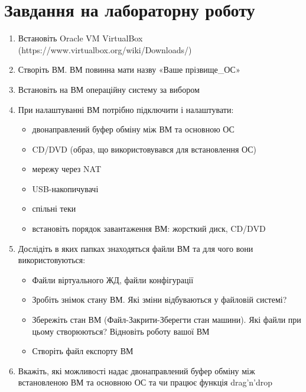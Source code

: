 \documentclass[12pt,a4paper]{article}
\begin{document}
\section{Завдання на лабораторну роботу}
\begin{enumerate}
	\item Встановіть Oracle VM VirtualBox (https://www.virtualbox.org/wiki/Downloads/)
	\item Створіть ВМ. ВМ повинна мати назву «Ваше прізвище\_ОС»
	\item Встановіть на ВМ операційну систему за вибором
	\item При налаштуванні ВМ потрібно підключити і налаштувати:
		\begin{itemize}
			\item двонаправлений буфер обміну між ВМ та основною ОС
			\item CD/DVD (образ, що використовувався для встановлення ОС)
			\item мережу через NAT
			\item USB-накопичувачі
			\item спільні теки
			\item встановіть порядок завантаження ВМ: жорсткий диск, CD/DVD
		\end{itemize}
	\item Дослідіть в яких папках знаходяться файли ВМ та для чого вони використовуються:
		\begin{itemize}
			\item Файли віртуального ЖД, файли конфігурації
			\item Зробіть знімок стану ВМ. Які зміни відбуваються у файловій системі?
			\item Збережіть стан ВМ (Файл-Закрити-Зберегти стан машини). Які файли при цьому
			створюються? Відновіть роботу вашої ВМ
			\item Створіть файл експорту ВМ
		\end{itemize}
	\item Вкажіть, які можливості надає двонаправлений буфер обміну між встановленою ВМ та
		основною ОС та чи працює функція drag'n'drop
\end{enumerate}
\end{document}

